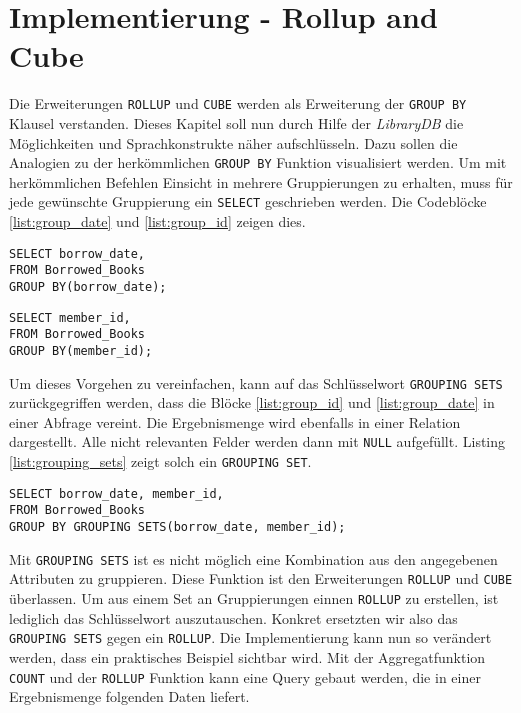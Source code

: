 \section{Implementierung - Rollup and Cube}
\label{sec:implementierung_rollup_and_cube} Die Erweiterungen \texttt{ROLLUP} und
\texttt{CUBE} werden als Erweiterung der \texttt{GROUP BY} Klausel verstanden.
Dieses Kapitel soll nun durch Hilfe der \textit{LibraryDB} die Möglichkeiten und
Sprachkonstrukte näher aufschlüsseln. Dazu sollen die Analogien zu der
herkömmlichen \texttt{GROUP BY} Funktion visualisiert werden. Um mit
herkömmlichen Befehlen Einsicht in mehrere Gruppierungen zu erhalten, muss für jede
gewünschte Gruppierung ein \texttt{SELECT} geschrieben werden. Die Codeblöcke \ref{list:group_date}
und \ref{list:group_id} zeigen dies.

\begin{minipage}{0.45\textwidth}
	 \begin{lstlisting}
SELECT borrow_date,
FROM Borrowed_Books
GROUP BY(borrow_date);
	\end{lstlisting}
\end{minipage}
\hfill
\begin{minipage}{0.45\textwidth}
	 \begin{lstlisting}
SELECT member_id,
FROM Borrowed_Books
GROUP BY(member_id);
	\end{lstlisting}
\end{minipage}

Um dieses Vorgehen zu vereinfachen, kann auf das Schlüsselwort \texttt{GROUPING
SETS} zurückgegriffen werden, dass die Blöcke \ref{list:group_id} und \ref{list:group_date}
in einer Abfrage vereint. Die Ergebnismenge wird ebenfalls in einer Relation
dargestellt. Alle nicht relevanten Felder werden dann mit \texttt{NULL}
aufgefüllt. Listing \ref{list:grouping_sets} zeigt solch ein \texttt{GROUPING
SET}.

\begin{lstlisting}[caption={Beispiel eines \texttt{GROUPING SETS}}, label={list:grouping_sets}]
SELECT borrow_date, member_id,
FROM Borrowed_Books
GROUP BY GROUPING SETS(borrow_date, member_id);
\end{lstlisting}

Mit \texttt{GROUPING SETS} ist es nicht möglich eine Kombination aus den
angegebenen Attributen zu gruppieren. Diese Funktion ist den Erweiterungen \texttt{ROLLUP}
und \texttt{CUBE} überlassen. Um aus einem Set an Gruppierungen einnen \texttt{ROLLUP}
zu erstellen, ist lediglich das Schlüsselwort auszutauschen. Konkret ersetzten wir
also das \texttt{GROUPING SETS} gegen ein \texttt{ROLLUP}. Die Implementierung
kann nun so verändert werden, dass ein praktisches Beispiel sichtbar wird. Mit
der Aggregatfunktion \texttt{COUNT} und der \texttt{ROLLUP} Funktion kann eine
Query gebaut werden, die in einer Ergebnismenge folgenden Daten liefert.

